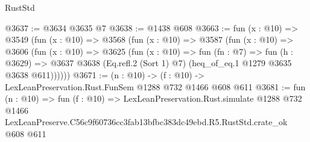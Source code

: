 \begin{lexlean}{RustStd}
\begin{coremodule}
@3637 := @3634 @3635 @7
@3638 := @1438 @608
@3663 := fun (x : @10) =>
  @3549
    (fun (x : @10) =>
    @3568
      (fun (x : @10) =>
      @3587
        (fun (x : @10) =>
        @3606
          (fun (x : @10) =>
          @3625
            (fun (x : @10) =>
            fun (fn : @7) =>
            fun (h : @3629) =>
            @3637 @3638 (Eq.refl.{2} (Sort 1) @7) (heq_of_eq.{1} @1279 @3635 @3638 @611))))))
@3671 := (n : @10) -> (f : @10) -> LexLeanPreservation.Rust.FunSem @1288 @732 @1466 @608 @611
@3681 := fun (n : @10) =>
  fun (f : @10) =>
  LexLeanPreservation.Rust.simulate
    @1288
    @732
    @1466
    LexLeanPreserve.C56c9f60736cc3fab13bfbc383dc49ebd.R5.RustStd.crate_ok
    @608
    @611
\end{coremodule}
\end{lexlean}
